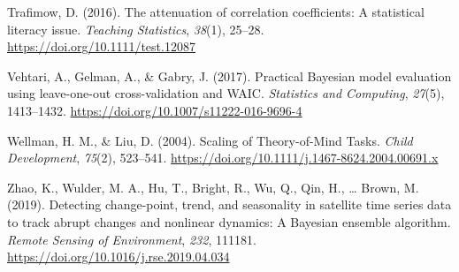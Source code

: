 \documentclass[
  man,mask,floatsintext]{apa6}
\newlength{\cslhangindent}
\newlength{\cslentryspacingunit} %
\newenvironment{CSLReferences}[2] %
 {%
  \setlength{\parindent}{0pt}
  \ifodd #1
  \let\oldpar\par
  \def\par{\hangindent=\cslhangindent\oldpar}
  \fi
  \setlength{\parskip}{#2\cslentryspacingunit}
 }%
 {}
\begin{document}
\begin{CSLReferences}{1}{0}
\leavevmode{}%
Trafimow, D. (2016). The attenuation of correlation coefficients: A statistical literacy issue. \emph{Teaching Statistics}, \emph{38}(1), 25--28. \url{https://doi.org/10.1111/test.12087}

\leavevmode{}%
Vehtari, A., Gelman, A., \& Gabry, J. (2017). Practical {Bayesian} model evaluation using leave-one-out cross-validation and {WAIC}. \emph{Statistics and Computing}, \emph{27}(5), 1413--1432. \url{https://doi.org/10.1007/s11222-016-9696-4}

\leavevmode{}%
Wellman, H. M., \& Liu, D. (2004). Scaling of {Theory-of-Mind Tasks}. \emph{Child Development}, \emph{75}(2), 523--541. \url{https://doi.org/10.1111/j.1467-8624.2004.00691.x}

\leavevmode{}%
Zhao, K., Wulder, M. A., Hu, T., Bright, R., Wu, Q., Qin, H., \ldots{} Brown, M. (2019). Detecting change-point, trend, and seasonality in satellite time series data to track abrupt changes and nonlinear dynamics: {A Bayesian} ensemble algorithm. \emph{Remote Sensing of Environment}, \emph{232}, 111181. \url{https://doi.org/10.1016/j.rse.2019.04.034}

\end{CSLReferences}

\endgroup
\end{document}

